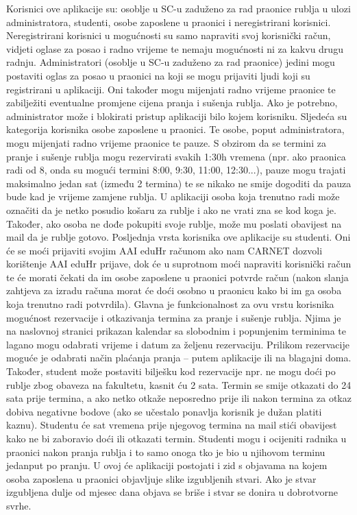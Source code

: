 			{Korisnici ove aplikacije su: osoblje u SC-u zaduženo za rad praonice rublja u ulozi administratora,
			studenti, osobe zaposlene u praonici i neregistrirani korisnici.
			Neregistrirani korisnici u mogućnosti su samo napraviti svoj korisnički račun, vidjeti oglase za posao i
			radno vrijeme te nemaju mogućnosti ni za kakvu drugu radnju.
			Administratori (osoblje u SC-u zaduženo za rad praonice) jedini mogu postaviti oglas za posao u praonici
			na koji se mogu prijaviti ljudi koji su registrirani u aplikaciji. Oni također mogu mijenjati radno vrijeme
			praonice te zabilježiti eventualne promjene cijena pranja i sušenja rublja. Ako je potrebno,
			administrator može i blokirati pristup aplikaciji bilo kojem korisniku.
			Sljedeća su kategorija korisnika osobe zaposlene u praonici. Te osobe, poput administratora, mogu
			mijenjati radno vrijeme praonice te pauze. S obzirom da se termini za pranje i sušenje rublja mogu
			rezervirati svakih 1:30h vremena (npr. ako praonica radi od 8, onda su mogući termini 8:00, 9:30, 11:00,
			12:30...), pauze mogu trajati maksimalno jedan sat (između 2 termina) te se nikako ne smije dogoditi da
			pauza bude kad je vrijeme zamjene rublja. U aplikaciji osoba koja trenutno radi može označiti da je netko
			posudio košaru za rublje i ako ne vrati zna se kod koga je. Također, ako osoba ne dođe pokupiti svoje rublje,
			može mu poslati obavijest na mail da je rublje gotovo.
			Posljednja vrsta korisnika ove aplikacije su studenti. Oni će se moći prijaviti svojim AAI eduHr računom
			ako nam CARNET dozvoli korištenje AAI eduHr prijave, dok će u suprotnom moći napraviti korisnički
			račun te će morati čekati da im osobe zaposlene u praonici potvrde račun (nakon slanja zahtjeva za
			izradu računa morat će doći osobno u praonicu kako bi im ga osoba koja trenutno radi potvrdila).
			Glavna je funkcionalnost za ovu vrstu korisnika mogućnost rezervacije i otkazivanja termina za pranje i
			sušenje rublja. Njima je na naslovnoj stranici prikazan kalendar sa slobodnim i popunjenim terminima te
			lagano mogu odabrati vrijeme i datum za željenu rezervaciju. Prilikom rezervacije moguće je odabrati
			način plaćanja pranja – putem aplikacije ili na blagajni doma. Također, student može postaviti bilješku
			kod rezervacije npr. ne mogu doći po rublje zbog obaveza na fakultetu, kasnit ću 2 sata. Termin se smije
			otkazati do 24 sata prije termina, a ako netko otkaže neposredno prije ili nakon termina za otkaz dobiva
			negativne bodove (ako se učestalo ponavlja korisnik je dužan platiti kaznu). Studentu će sat vremena
			prije njegovog termina na mail stići obavijest kako ne bi zaboravio doći ili otkazati termin.
			Studenti mogu i ocijeniti radnika u praonici nakon pranja rublja i to samo onoga tko je bio u njihovom
			terminu jedanput po pranju.
			U ovoj će aplikaciji postojati i zid s objavama na kojem osoba zaposlena u praonici objavljuje slike
			izgubljenih stvari. Ako je stvar izgubljena dulje od mjesec dana objava se briše i stvar se donira u
			dobrotvorne svrhe. }
		
